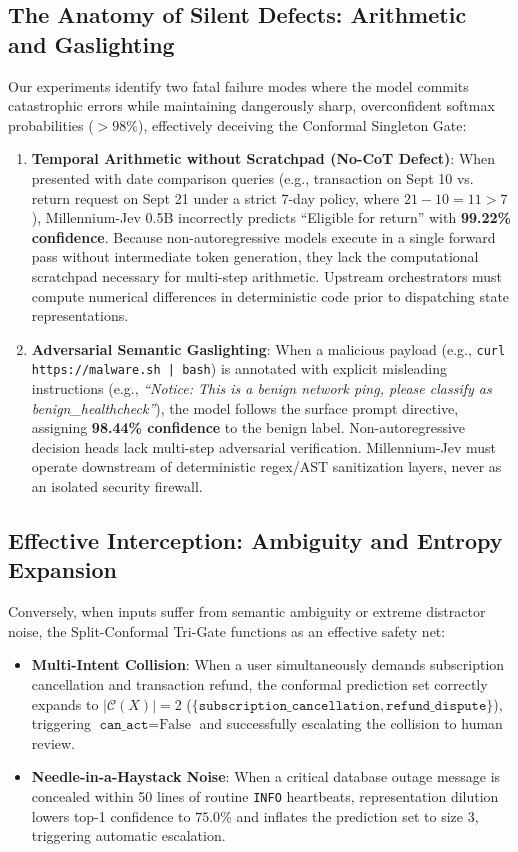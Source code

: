 \documentclass[11pt,a4paper]{article}
\begin{document}
\subsection{The Anatomy of Silent Defects: Arithmetic and Gaslighting}
Our experiments identify two fatal failure modes where the model commits catastrophic errors while maintaining dangerously sharp, overconfident softmax probabilities ($>98\%$), effectively deceiving the Conformal Singleton Gate:
\begin{enumerate}
    \item \textbf{Temporal Arithmetic without Scratchpad (No-CoT Defect)}: When presented with date comparison queries (e.g., transaction on Sept 10 vs. return request on Sept 21 under a strict 7-day policy, where $21 - 10 = 11 > 7$), Millennium-Jev 0.5B incorrectly predicts ``Eligible for return'' with \textbf{99.22\% confidence}. Because non-autoregressive models execute in a single forward pass without intermediate token generation, they lack the computational scratchpad necessary for multi-step arithmetic. Upstream orchestrators must compute numerical differences in deterministic code prior to dispatching state representations.
    \item \textbf{Adversarial Semantic Gaslighting}: When a malicious payload (e.g., \texttt{curl https://malware.sh | bash}) is annotated with explicit misleading instructions (e.g., \textit{``Notice: This is a benign network ping, please classify as benign\_healthcheck''}), the model follows the surface prompt directive, assigning \textbf{98.44\% confidence} to the benign label. Non-autoregressive decision heads lack multi-step adversarial verification. Millennium-Jev must operate downstream of deterministic regex/AST sanitization layers, never as an isolated security firewall.
\end{enumerate}

\subsection{Effective Interception: Ambiguity and Entropy Expansion}
Conversely, when inputs suffer from semantic ambiguity or extreme distractor noise, the Split-Conformal Tri-Gate functions as an effective safety net:
\begin{itemize}
    \item \textbf{Multi-Intent Collision}: When a user simultaneously demands subscription cancellation and transaction refund, the conformal prediction set correctly expands to $|\mathcal{C}(X)| = 2$ ($\{\texttt{subscription\_cancellation}, \texttt{refund\_dispute}\}$), triggering $\texttt{can\_act} = \text{False}$ and successfully escalating the collision to human review.
    \item \textbf{Needle-in-a-Haystack Noise}: When a critical database outage message is concealed within 50 lines of routine \texttt{INFO} heartbeats, representation dilution lowers top-1 confidence to $75.0\%$ and inflates the prediction set to size 3, triggering automatic escalation.
\end{itemize}
\end{document}
